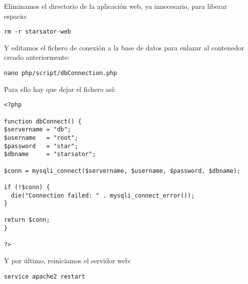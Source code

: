 Eliminamos el directorio de la aplicación web, ya innecesario, para liberar espacio:

\begin{lstlisting}
rm -r starsator-web
\end{lstlisting}

Y editamos el fichero de conexión a la base de datos para enlazar al contenedor creado anteriormente:

\begin{lstlisting}
nano php/script/dbConnection.php
\end{lstlisting}

Para ello hay que dejar el fichero así:

\begin{lstlisting}[style=PHP]
<?php

function dbConnect() {
$servername = "db";
$username   = "root";
$password   = "star";
$dbname     = "starsator";

$conn = mysqli_connect($servername, $username, $password, $dbname);

if (!$conn) {
  die("Connection failed: " . mysqli_connect_error());
}

return $conn;
}

?>
\end{lstlisting}

Y por último, reiniciamos el servidor web:

\begin{lstlisting}
service apache2 restart
\end{lstlisting}





\newpage


